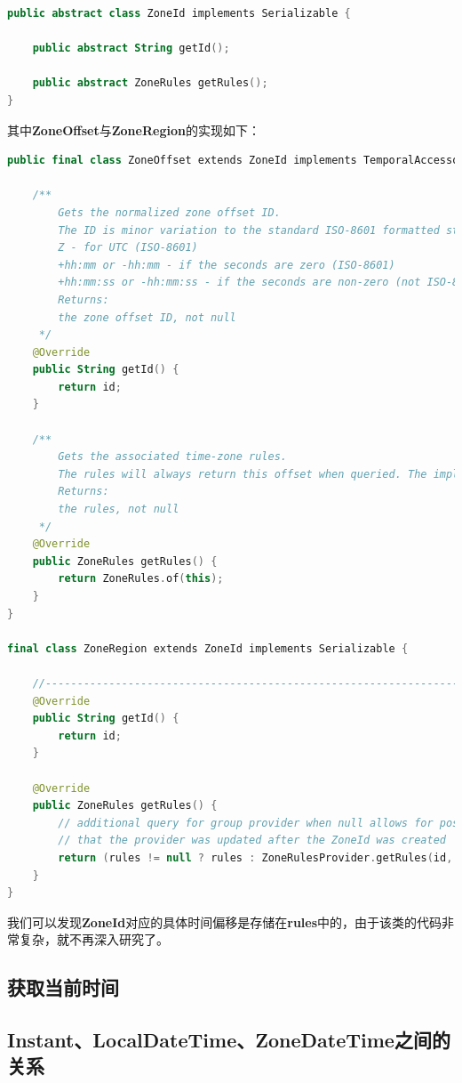 \documentclass[cn,10pt,math=newtx,citestyle=gb7714-2015,bibstyle=gb7714-2015]{elegantbook}
\begin{document}
    \begin{lstlisting}[language=Kotlin]
public abstract class ZoneId implements Serializable {
    
    public abstract String getId();

    public abstract ZoneRules getRules();
}

    \end{lstlisting}

    其中\textbf{ZoneOffset}与\textbf{ZoneRegion}的实现如下：

    \begin{lstlisting}[language=Kotlin]
public final class ZoneOffset extends ZoneId implements TemporalAccessor, TemporalAdjuster, Comparable<ZoneOffset>, Serializable {
    
    /**
        Gets the normalized zone offset ID.
        The ID is minor variation to the standard ISO-8601 formatted string for the offset. There are three formats:
        Z - for UTC (ISO-8601)
        +hh:mm or -hh:mm - if the seconds are zero (ISO-8601)
        +hh:mm:ss or -hh:mm:ss - if the seconds are non-zero (not ISO-8601)
        Returns:
        the zone offset ID, not null
     */
    @Override
    public String getId() {
        return id;
    }
    
    /**
        Gets the associated time-zone rules.
        The rules will always return this offset when queried. The implementation class is immutable, thread-safe and serializable.
        Returns:
        the rules, not null
     */
    @Override
    public ZoneRules getRules() {
        return ZoneRules.of(this);
    }
}

final class ZoneRegion extends ZoneId implements Serializable {

    //-----------------------------------------------------------------------
    @Override
    public String getId() {
        return id;
    }

    @Override
    public ZoneRules getRules() {
        // additional query for group provider when null allows for possibility
        // that the provider was updated after the ZoneId was created
        return (rules != null ? rules : ZoneRulesProvider.getRules(id, false));
    }
}
    \end{lstlisting}

    我们可以发现\textbf{ZoneId}对应的具体时间偏移是存储在\textbf{rules}中的，由于该类的代码非常复杂，就不再深入研究了。

    \subsection{获取当前时间}
    \subsection{Instant、LocalDateTime、ZoneDateTime之间的关系}
\end{document}
